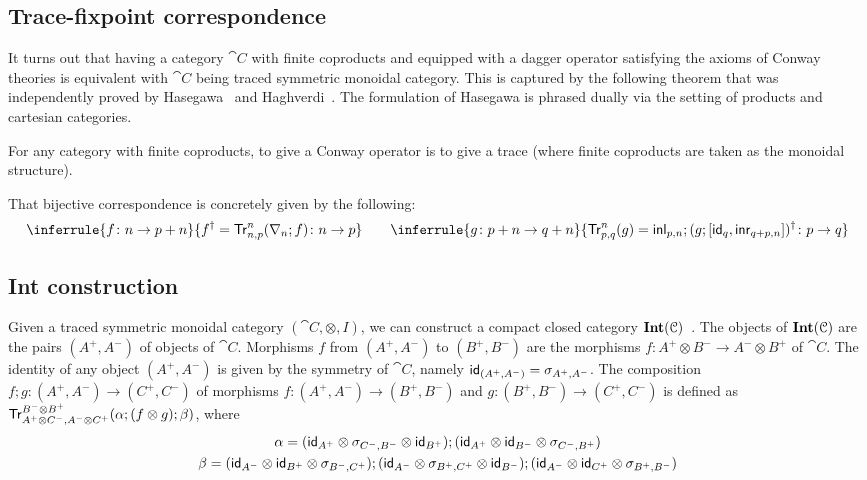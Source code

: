 \subsection{Trace-fixpoint correspondence}
It turns out that having a category $\cat{C}$ with finite coproducts and equipped with a dagger operator satisfying the axioms of Conway theories is equivalent with $\cat{C}$ being traced symmetric monoidal category. This is captured by the following theorem that was independently proved by Hasegawa~\cite{Hasegawa:1997:Models} and Haghverdi~\cite{Haghverdi:2000:Categorical}. The formulation of Hasegawa is phrased dually via the setting of products and cartesian categories.
\begin{theorem}\label{thm:trace}
For any category with finite coproducts, to give a Conway operator is to give a trace (where finite coproducts are taken as the monoidal structure). 
\end{theorem}
That bijective correspondence is concretely given by the following:
\begin{gather*}
	\inferrule{f \colon  n \to p + n}{f^\dagger = \Tr^n_{n,p} (\nabla_n ; f) \colon n \to p} 
	\qquad
	\inferrule{g \colon p + n \to q + n}{\Tr^{n}_{p,q}(g) = \inl_{p,n} ; (g; \lc\id_q, \inr_{q +p,n} \rc)^\dagger  \colon p \to q}
\end{gather*}	

\subsection{Int construction}\label{c3:subsec:int}
Given a traced symmetric monoidal category $(\cat{C}, \otimes, I)$, we can construct a compact closed category $\mathbf{Int}(\mathcal{C})$~\cite{Joyal:1996:Traced}. The objects of $\mathbf{Int}(\mathcal{C})$ are the pairs $(A^+,A^-)$ of objects of $\cat{C}$. Morphisms $f$ from $(A^+, A^-)$ to $(B^+, B^-)$ are the morphisms $f \colon A^+ \otimes B^- \to A^- \otimes B^+$ of $\cat{C}$. The identity of any object $(A^+, A^-)$ is given by the symmetry of $\cat{C}$, namely $\mathsf{id}_{(A^ +, A^-)} = \sigma_{A^+, A^-}$. The composition $f ; g \colon (A^+, A^-) \to (C^+, C^-)$ of morphisms $f \colon (A^+, A^-) \to (B^{+}, B^-)$ and $g \colon (B^+, B^-) \to (C^+,C^-)$ is defined as
	$
		\mathsf{Tr}^{B^- \otimes B^+}_{A^+ \otimes C^-, A^- \otimes C^+} (\alpha ; (f \otimes g) ; \beta)
	$, where \begin{gather*}\alpha = (\mathsf{id}_{A^+} \otimes \sigma_{C^-, B^-} \otimes \mathsf{id}_{B^+});(\mathsf{id}_{A^+} \otimes \mathsf{id}_{B^-} \otimes \sigma_{C^-, B^+})\\\beta = (\mathsf{id}_{A^-} \otimes \mathsf{id}_{B^+} \otimes \sigma_{B^-, C^+}); (\mathsf{id}_{A^-} \otimes \sigma_{B^+, C^+} \otimes \mathsf{id}_{B^-});(\mathsf{id}_{A^-} \otimes \mathsf{id}_{C^+} \otimes \sigma_{B^+, B^-})\end{gather*}
	
